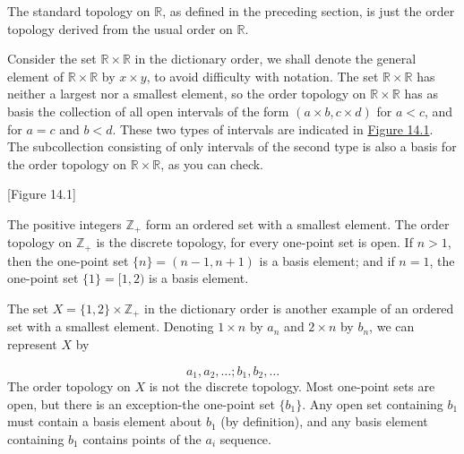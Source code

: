 \begin{centeredblock}
 \begin{example}
\label{ex:\thesection.\theexample}
  The standard topology on \(\mathbb{R}\), as defined in the preceding section, is just the order topology derived from the usual order on \(\mathbb{R}\).
 \end{example}
\end{centeredblock}

\begin{centeredblock}
 \begin{example}
\label{ex:\thesection.\theexample}
  Consider the set \(\mathbb{R} \times \mathbb{R}\) in the dictionary order, we shall denote the general element of \(\mathbb{R} \times \mathbb{R}\) by \(x \times y\), to avoid difficulty with notation. The set \(\mathbb{R} \times \mathbb{R}\) has neither a largest nor a smallest element, so the order topology on \(\mathbb{R} \times \mathbb{R}\) has as basis the collection of all open intervals of the form \(( {a \times b,c \times d})\) for \(a < c\), and for \(a = c\) and \(b < d\). These two types of intervals are indicated in \hyperref[fig:14.1]{Figure 14.1}. The subcollection consisting of only intervals of the second type is also a basis for the order topology on \(\mathbb{R} \times \mathbb{R}\), as you can check.

 [Figure 14.1]
 \end{example}
\end{centeredblock}

\begin{centeredblock}
 \begin{example}
\label{ex:\thesection.\theexample}
  The positive integers \(\mathbb{Z}_{ + }\) form an ordered set with a smallest element. The order topology on \(\mathbb{Z}_{ + }\) is the discrete topology, for every one-point set is open. If \(n > 1\), then the one-point set \(\{ n\} = ( {n - 1,n + 1})\) is a basis element; and if \(n = 1\), the one-point set \(\{ 1\} = \lbrack 1,2)\) is a basis element.
 \end{example}
\end{centeredblock}

\begin{centeredblock}
 \begin{example}
\label{ex:\thesection.\theexample}
  The set \(X = \{ 1,2\} \times {\mathbb{Z}}_{ + }\) in the dictionary order is another example of an ordered set with a smallest element. Denoting \(1 \times n\) by \(a_{n}\) and \(2 \times n\) by \(b_{n}\), we can represent \(X\) by

  \[
  a_{1},a_{2},\ldots ;b_{1},b_{2},\ldots
  \]
  The order topology on \(X\) is not the discrete topology. Most one-point sets are open, but there is an exception-the one-point set \(\{ b_{1}\}\). Any open set containing \(b_{1}\) must contain a basis element about \(b_{1}\) (by definition), and any basis element containing \(b_{1}\) contains points of the \(a_{i}\) sequence.
 \end{example}
\end{centeredblock}

